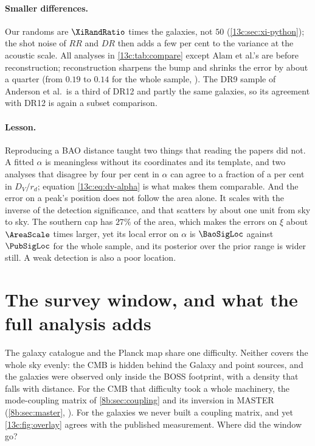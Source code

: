 \paragraph{Smaller differences.} Our randoms are $\XiRandRatio$ times the galaxies, not
$50$ (\cref{13c:sec:xi-python}); the shot noise of $RR$ and $DR$ then adds a few per
cent to the variance at the acoustic scale. All analyses in \cref{13c:tab:compare}
except Alam et al.'s are before reconstruction; reconstruction sharpens the bump and
shrinks the error by about a quarter (from $0.19$ to $0.14$ for the whole sample,
). The DR9 sample
of Anderson et al.\ is a third of DR12 and partly the same galaxies, so its
agreement with DR12 is again a subset comparison.

\paragraph{Lesson.} Reproducing a BAO distance taught two things that reading the papers
did not. A fitted $\alpha$ is meaningless without its coordinates and its template, and
two analyses that disagree by four per cent in $\alpha$ can agree to a fraction of a
per cent in $D_V/r_d$;
equation \eqref{13c:eq:dv-alpha} is what makes them comparable. And the error on a
peak's position does not follow the area alone. It scales with the inverse of the
detection significance, and that scatters by about one unit from sky to sky. The
southern cap has $27\%$ of the area, which makes the errors on $\xi$ about
$\AreaScale$ times larger, yet its local error on $\alpha$ is $\BaoSigLoc$ against
$\PubSigLoc$ for the whole sample, and its posterior over the prior range is wider
still. A weak detection is also a poor location.
\section{The survey window, and what the full analysis adds}
\label{13c:sec:full}

The galaxy catalogue and the Planck map share one difficulty. Neither covers the whole
sky evenly: the CMB is hidden behind the Galaxy and point sources, and the galaxies
were observed only inside the BOSS footprint, with a density that falls with distance.
For the CMB that difficulty took a whole machinery, the mode-coupling matrix of
\cref{8b:sec:coupling} and its inversion in MASTER (\cref{8b:sec:master},
\cite{Hivon2002}). For the galaxies we never built a coupling matrix, and yet
\cref{13c:fig:overlay} agrees with the published measurement. Where did the window go?


